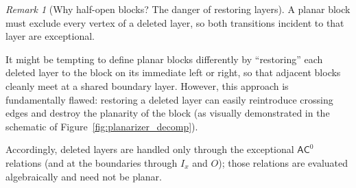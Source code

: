 \documentclass[11pt]{article}
\theoremstyle{definition}
\theoremstyle{remark}
\newtheorem{remark}[theorem]{Remark}
\newcommand{\AC}{\mathsf{AC}^0}
\begin{document}
\begin{remark}[Why half-open blocks? The danger of restoring layers]\label{rem:k33}
A planar block must exclude every vertex of a deleted layer, so both transitions incident to that layer are exceptional.

It might be tempting to define planar blocks differently by ``restoring'' each deleted layer to the block on its immediate left or right, so that adjacent blocks cleanly meet at a shared boundary layer. However, this approach is fundamentally flawed: restoring a deleted layer can easily reintroduce crossing edges and destroy the planarity of the block (as visually demonstrated in the schematic of Figure~\ref{fig:planarizer_decomp}).

Accordingly, deleted layers are handled only through the exceptional $\AC$ relations (and at the boundaries through $I_x$ and $O$); those relations are evaluated algebraically and need not be planar.
\end{remark}
\end{document}
